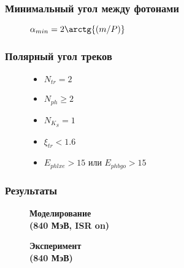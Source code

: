 \documentclass[14pt, hyperref = {colorlinks}]{beamer}
\begin{document}
\begin{frame}\label{r1}
\frametitle{Минимальный угол между фотонами}
\begin{figure}[h]
    \center\textbf{$\alpha_{min} = 2\arctg{(m/P)}$}\\
\begin{minipage}[h]{0.49\linewidth}   
\end{minipage}
\begin{minipage}[h]{0.49\linewidth}
    \begin{itemize}
    \end{itemize}
\end{minipage}
\hfill
\end{figure}
\end{frame}

\begin{frame}
\frametitle{Полярный угол треков}
\begin{figure}[h]
\begin{minipage}[h]{0.69\linewidth}   
\end{minipage}
\begin{minipage}[h]{0.29\linewidth}
    \begin{itemize}
        \item {$N_{tr} = 2$}
        \item {$N_{ph} \geq 2$}
        \item {$N_{K_{S}} = 1$}
        \item {$\xi_{tr} < 1.6$}
        \item {$E_{phlxe} > 15$ или $E_{phbgo} > 15$}
    \end{itemize}
\end{minipage}
\hfill
\end{figure}
\end{frame}

\begin{frame}\label{r2}
\frametitle{Результаты}
\begin{figure}[h]
  \begin{minipage}[h]{0.49\linewidth}
    \center\textbf{Моделирование \\(840 МэВ, ISR on)}
  \end{minipage}
  \hfill
  \begin{minipage}[h]{0.49\linewidth}
    \center\textbf{Эксперимент \\(840 МэВ)}
  \end{minipage}
\end{figure}
\end{frame}
\end{document}
